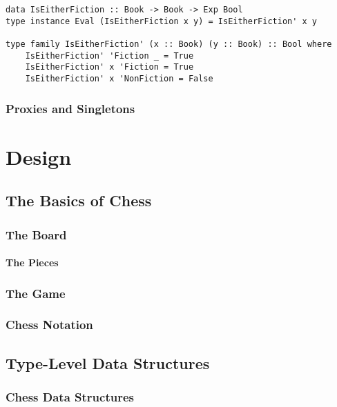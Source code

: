 \documentclass[12pt, a4paper, bibliography=totocnumbered]{scrreprt}
\begin{document}
\begin{lstlisting}
data IsEitherFiction :: Book -> Book -> Exp Bool
type instance Eval (IsEitherFiction x y) = IsEitherFiction' x y

type family IsEitherFiction' (x :: Book) (y :: Book) :: Bool where
    IsEitherFiction' 'Fiction _ = True
    IsEitherFiction' x 'Fiction = True
    IsEitherFiction' x 'NonFiction = False
\end{lstlisting}

\subsection{Proxies and Singletons}



\chapter{Design}

\section{The Basics of Chess}

\subsection{The Board}

\subsubsection{The Pieces}

\subsection{The Game}

\subsection{Chess Notation}

\section{Type-Level Data Structures}

\subsection{Chess Data Structures}
\end{document}
